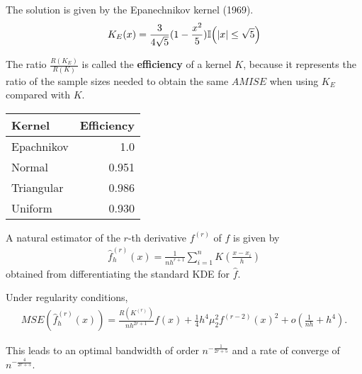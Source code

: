 The solution is given by the Epanechnikov kernel (1969).
\begin{align}
  \label{eq:41}
  K_{E}(x) = \frac{3}{4 \sqrt{5}}(1 - \frac{x^{2}}{5}) \I{|x| \leq \sqrt{5}}
\end{align}

The ratio $\frac{R(K_{E})}{R(K)}$ is called the \textbf{efficiency} of
a kernel $K$, because it represents the ratio of the sample sizes
needed to obtain the same $AMISE$ when using $K_{E}$ compared with $K$.


\begin{center}
\begin{tabular}{lr}
Kernel & Efficiency \\
\hline
Epachnikov & 1.0 \\
Normal & 0.951 \\
Triangular & 0.986 \\
Uniform & 0.930 \\
\end{tabular}
\end{center}

\begin{thm}
  A natural estimator of the $r$-th derivative $f^{(r)}$ of $f$ is given
by
\begin{align}
  \label{eq:33}
  \hat f^{(r)}_{h}(x) = \frac{1}{n h^{r+1}} \sum_{i=1}^{n} K(\frac{x -
  x_{i}}{h})
\end{align}
obtained from differentiating the standard KDE for $\hat f$.

Under regularity conditions,
\begin{align}
  \label{eq:39}
  MSE(\hat f^{(r)}_{h}(x)) = \frac{R(K^{(r)})}{nh^{2r+1}}f(x) +
  \frac{1}{4} h^{4} \mu_{2}^{2} f^{(r-2)}(x)^{2} + o(\frac{1}{nh} + h^{4}).
\end{align}

This leads to an optimal bandwidth of order $n^{-\frac{1}{2r + 5}}$
and a rate of converge of $n^{-\frac{4}{2r+5}}$.

\end{thm}

